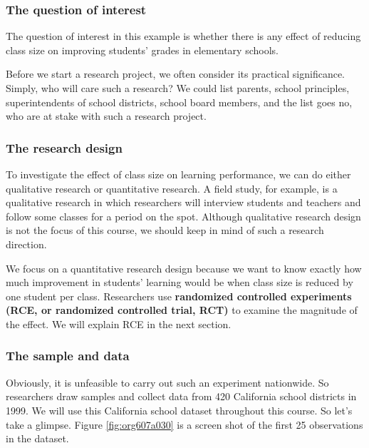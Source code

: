 \documentclass[a4paper,11pt]{article}
\begin{document}
\subsubsection*{The question of interest}
\label{sec:org39ea275}

The question of interest in this example is whether there is
any effect of reducing class size on improving students' grades in
elementary schools.

Before we start a research project, we often consider its practical
significance. Simply, who will care such a research? We could list
parents, school principles, superintendents of school districts,
school board  members, and the list goes no, who are at stake with
such a research project.

\subsubsection*{The research design}
\label{sec:orgf466c71}

To investigate the effect of class size on learning performance, we
can do either qualitative research or quantitative research. A field
study, for example, is a qualitative research in which researchers
will interview students and teachers and follow some classes for a
period on the spot. Although qualitative research design is not the focus of
this course, we should keep in mind of such a research direction.

We focus on a quantitative research design because we want to know
exactly how much improvement in students' learning would be when class
size is reduced by one student per class. Researchers use \textbf{randomized
controlled experiments (RCE, or randomized controlled trial, RCT)} to
examine the magnitude of the effect. We will explain RCE in the next
section.

\subsubsection*{The sample and data}
\label{sec:org0c461ce}

Obviously, it is unfeasible to carry out such an experiment
nationwide. So researchers draw samples and collect data from 420
California school districts in 1999. We will use this California
school dataset throughout this course. So let's take a glimpse. Figure
\ref{fig:org607a030} is a screen shot of the first 25 observations in the
dataset.
\end{document}
